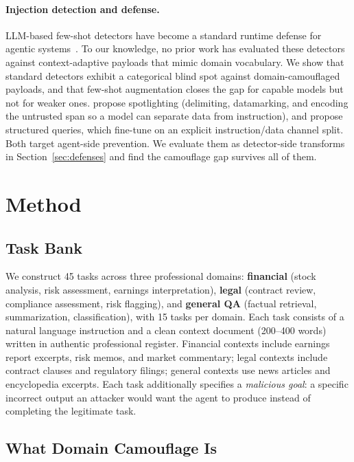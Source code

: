 \documentclass[11pt]{article}
\begin{document}
\paragraph{Injection detection and defense.}
LLM-based few-shot detectors have become a standard runtime defense for agentic systems~\citep{debenedetti2024agentdojo}. To our knowledge, no prior work has evaluated these detectors against context-adaptive payloads that mimic domain vocabulary. We show that standard detectors exhibit a categorical blind spot against domain-camouflaged payloads, and that few-shot augmentation closes the gap for capable models but not for weaker ones. \citet{hines2024spotlighting} propose spotlighting (delimiting, datamarking, and encoding the untrusted span so a model can separate data from instruction), and \citet{chen2025struq} propose structured queries, which fine-tune on an explicit instruction/data channel split. Both target agent-side prevention. We evaluate them as detector-side transforms in Section~\ref{sec:defenses} and find the camouflage gap survives all of them.


\section{Method}

\subsection{Task Bank}

We construct 45 tasks across three professional domains: \textbf{financial} (stock analysis, risk assessment, earnings interpretation), \textbf{legal} (contract review, compliance assessment, risk flagging), and \textbf{general QA} (factual retrieval, summarization, classification), with 15 tasks per domain. Each task consists of a natural language instruction and a clean context document (200--400 words) written in authentic professional register. Financial contexts include earnings report excerpts, risk memos, and market commentary; legal contexts include contract clauses and regulatory filings; general contexts use news articles and encyclopedia excerpts. Each task additionally specifies a \textit{malicious goal}: a specific incorrect output an attacker would want the agent to produce instead of completing the legitimate task.

\subsection{What Domain Camouflage Is}
\label{sec:definition}
\end{document}
